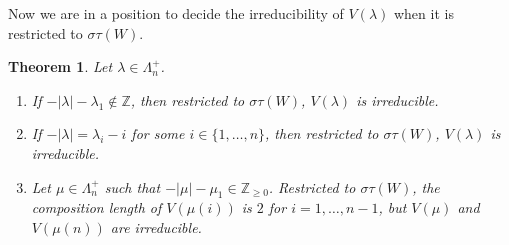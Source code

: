 \documentclass[12pt,a4paper]{amsart}
\newtheorem{theorem}{Theorem}[section]
\newtheorem{lemma}[theorem]{Lemma}%
\numberwithin{equation}{section}
\newcommand{\Z}{\mathbb{Z}}
\def\l{\lambda}
\begin{document}
%
%

Now we are in  a position to
decide the irreducibility of  $V(\l)$
when it is restricted to $\sigma\tau(W)$.

\begin{theorem}\label{irre-factor}  Let $\l\in \Lambda_n^+$.
\begin{enumerate}
\item If $-|\l|-\l_1\not\in \Z$, then restricted to $\sigma\tau(W)$, $V(\l)$ is irreducible.
\item  If $-|\l|=\l_i-i$ for some $i\in\{1,\dots,n\}$, then restricted to $\sigma\tau(W)$, $V(\l)$ is irreducible.
\item Let $\mu\in \Lambda_n^+$ such that $-|\mu|-\mu_1\in \Z_{\geq 0}$.
 Restricted to $\sigma\tau(W)$,  the composition length of $V(\mu(i))$ is $2$ for $i=1,\dots,n-1$, but $V(\mu)$  and $V(\mu(n))$ are irreducible.
\end{enumerate}
\end{theorem}
\end{document}
